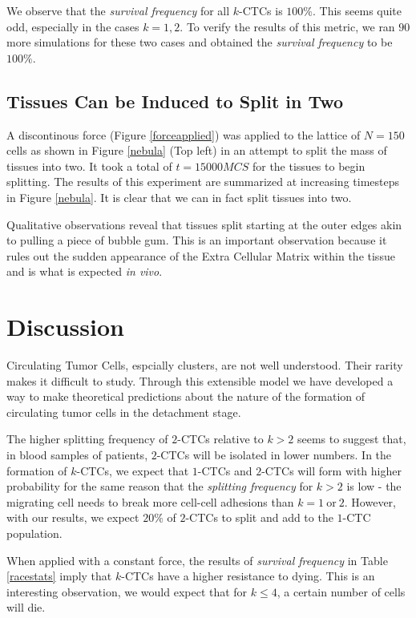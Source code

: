 \documentclass[12pt]{article}
\begin{document}
We observe that the \emph{survival frequency} for all $k$-CTCs is $100\%$. This seems quite odd, especially in the cases $k=1,2$. To verify the results of this metric, we ran $90$ more simulations for these two cases and obtained the \emph{survival frequency} to be $100\%$.

\subsection{Tissues Can be Induced to Split in Two}
A discontinous force (Figure \ref{forceapplied}) was applied to the lattice of $N=150$ cells as shown in Figure \ref{nebula} (Top left) in an attempt to split the mass of tissues into two. It took a total of $t=15000MCS$ for the tissues to begin splitting. The results of this experiment are summarized at increasing timesteps in Figure \ref{nebula}. It is clear that we can in fact split tissues into two.

Qualitative observations reveal that tissues split starting at the outer edges akin to pulling a piece of bubble gum. This is an important observation because it rules out the sudden appearance of the Extra Cellular Matrix within the tissue and is what is expected \emph{in vivo}.
\section{Discussion}
Circulating Tumor Cells, espcially clusters, are not well understood. Their rarity makes it difficult to study. Through this extensible model we have developed a way to make theoretical predictions about the nature of the formation of circulating tumor cells in the detachment stage. 

The higher splitting frequency of $2$-CTCs relative to $k>2$ seems to suggest that, in blood samples of patients, $2$-CTCs will be isolated in lower numbers. In the formation of $k$-CTCs, we expect that $1$-CTCs and $2$-CTCs will form with higher probability for the same reason that the \emph{splitting frequency} for $k>2$ is low - the migrating cell needs to break more cell-cell adhesions than $k=1~\text{or}~2$. However, with our results, we expect $20\%$ of $2$-CTCs to split and add to the $1$-CTC population.

When applied with a constant force, the results of \emph{survival frequency} in Table \ref{racestats} imply that $k$-CTCs have a higher resistance to dying. This is an interesting observation, we would expect that for $k\leq4$, a certain number of cells will die. 
\end{document}

